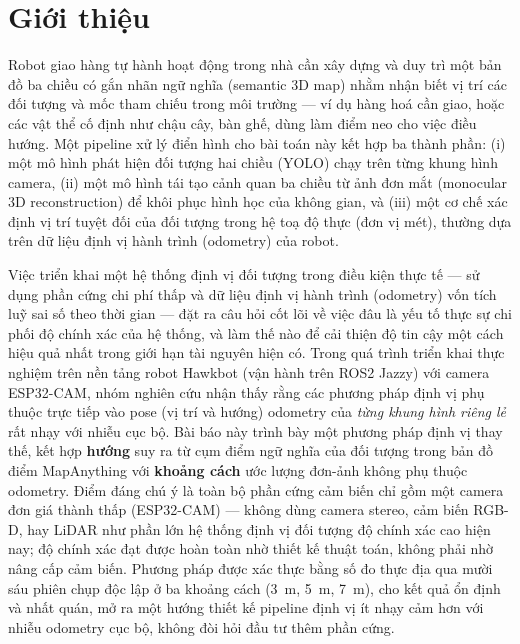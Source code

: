\documentclass[10pt,a4paper,twocolumn]{article}
\begin{document}
\section{Giới thiệu}

Robot giao hàng tự hành hoạt động trong nhà cần xây dựng và duy trì một bản đồ ba chiều có gắn nhãn ngữ nghĩa (semantic 3D map) nhằm nhận biết vị trí các đối tượng và mốc tham chiếu trong môi trường — ví dụ hàng hoá cần giao, hoặc các vật thể cố định như chậu cây, bàn ghế, dùng làm điểm neo cho việc điều hướng. Một pipeline xử lý điển hình cho bài toán này kết hợp ba thành phần: (i) một mô hình phát hiện đối tượng hai chiều (YOLO) chạy trên từng khung hình camera, (ii) một mô hình tái tạo cảnh quan ba chiều từ ảnh đơn mắt (monocular 3D reconstruction) để khôi phục hình học của không gian, và (iii) một cơ chế xác định vị trí tuyệt đối của đối tượng trong hệ toạ độ thực (đơn vị mét), thường dựa trên dữ liệu định vị hành trình (odometry) của robot.

Việc triển khai một hệ thống định vị đối tượng trong điều kiện thực tế — sử dụng phần cứng chi phí thấp và dữ liệu định vị hành trình (odometry) vốn tích luỹ sai số theo thời gian — đặt ra câu hỏi cốt lõi về việc đâu là yếu tố thực sự chi phối độ chính xác của hệ thống, và làm thế nào để cải thiện độ tin cậy một cách hiệu quả nhất trong giới hạn tài nguyên hiện có. Trong quá trình triển khai thực nghiệm trên nền tảng robot Hawkbot (vận hành trên ROS2 Jazzy) với camera ESP32-CAM, nhóm nghiên cứu nhận thấy rằng các phương pháp định vị phụ thuộc trực tiếp vào pose (vị trí và hướng) odometry của \emph{từng khung hình riêng lẻ} rất nhạy với nhiễu cục bộ. Bài báo này trình bày một phương pháp định vị thay thế, kết hợp \textbf{hướng} suy ra từ cụm điểm ngữ nghĩa của đối tượng trong bản đồ điểm MapAnything với \textbf{khoảng cách} ước lượng đơn-ảnh không phụ thuộc odometry. Điểm đáng chú ý là toàn bộ phần cứng cảm biến chỉ gồm một camera đơn giá thành thấp (ESP32-CAM) — không dùng camera stereo, cảm biến RGB-D, hay LiDAR như phần lớn hệ thống định vị đối tượng độ chính xác cao hiện nay; độ chính xác đạt được hoàn toàn nhờ thiết kế thuật toán, không phải nhờ nâng cấp cảm biến. Phương pháp được xác thực bằng số đo thực địa qua mười sáu phiên chụp độc lập ở ba khoảng cách (\SI{3}{\meter}, \SI{5}{\meter}, \SI{7}{\meter}), cho kết quả ổn định và nhất quán, mở ra một hướng thiết kế pipeline định vị ít nhạy cảm hơn với nhiễu odometry cục bộ, không đòi hỏi đầu tư thêm phần cứng.
\end{document}

